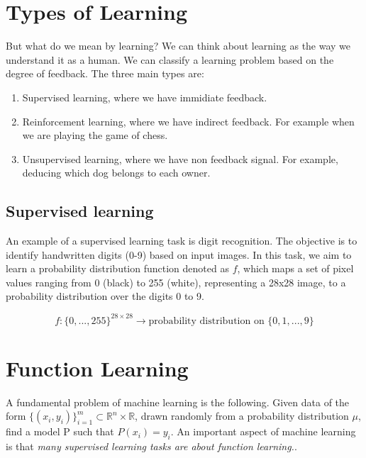 \documentclass[../main.tex]{subfiles}
\begin{document}
	\section{Types of Learning}
	\noindent  But what do we mean by learning? We can think about learning as the way we understand it as a human. We can classify a learning problem based on the degree of feedback. The three main types are: 
	\begin{enumerate}
		\item Supervised learning, where we have immidiate feedback. %
		\item Reinforcement learning, where we have indirect feedback. %
		 For example when we are playing the game of chess.
		\item Unsupervised learning, where we have non feedback signal. %
		For example, deducing which dog belongs to each owner.  
	\end{enumerate}
\subsection{Supervised learning}
	\noindent An example of a supervised learning task is digit recognition. The objective is to identify handwritten digits (0-9) based on input images. In this task, we aim to learn a probability distribution function denoted as $f$, which maps a set of pixel values ranging from 0 (black) to 255 (white), representing a 28x28 image, to a probability distribution over the digits 0 to 9.

$$f: \{0,..., 255\}^{28 \times 28} \longrightarrow \text{probability distribution on } \{0,1,...,9\}$$

	\section{Function Learning}
	\noindent 
	A fundamental problem of machine learning is the following. Given data of the form $\{(x_i,y_i)\}^m_{i=1} \subset \mathbb{R}^n \times \mathbb{R}$, drawn randomly from a probability distribution $\mu$, find a model P such that $P(x_i)=y_i$. An important aspect of machine learning is that \textit{many supervised learning tasks are about function learning.}. 
\end{document}
